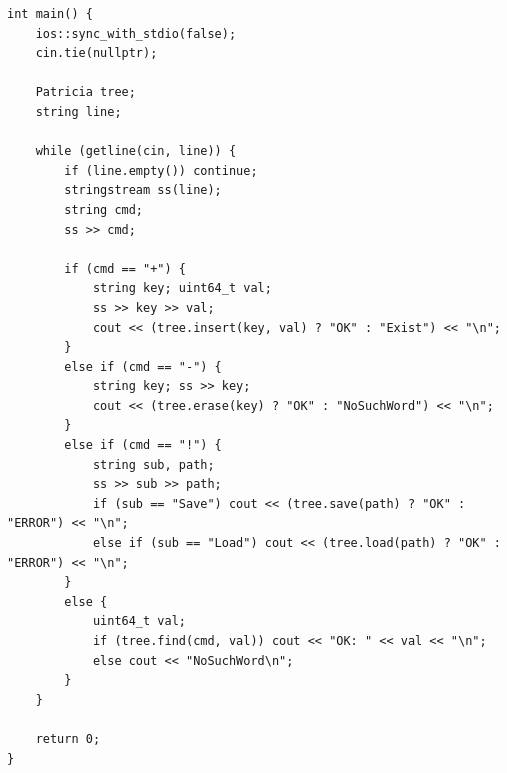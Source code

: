 \begin{lstlisting}[breaklines=true, postbreak=\mbox{\textcolor{red}{$\hookrightarrow$}\space}]
int main() {
    ios::sync_with_stdio(false);
    cin.tie(nullptr);

    Patricia tree;
    string line;

    while (getline(cin, line)) {
        if (line.empty()) continue;
        stringstream ss(line);
        string cmd;
        ss >> cmd;

        if (cmd == "+") {
            string key; uint64_t val;
            ss >> key >> val;
            cout << (tree.insert(key, val) ? "OK" : "Exist") << "\n";
        } 
        else if (cmd == "-") {
            string key; ss >> key;
            cout << (tree.erase(key) ? "OK" : "NoSuchWord") << "\n";
        } 
        else if (cmd == "!") {
            string sub, path;
            ss >> sub >> path;
            if (sub == "Save") cout << (tree.save(path) ? "OK" : "ERROR") << "\n";
            else if (sub == "Load") cout << (tree.load(path) ? "OK" : "ERROR") << "\n";
        } 
        else {
            uint64_t val;
            if (tree.find(cmd, val)) cout << "OK: " << val << "\n";
            else cout << "NoSuchWord\n";
        }
    }

    return 0;
}
\end{lstlisting}

\pagebreak